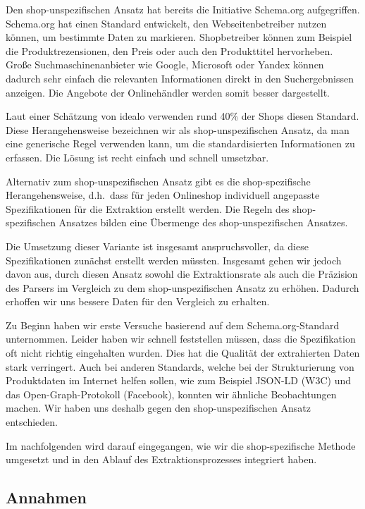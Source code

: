 Den shop-unspezifischen Ansatz hat bereits die Initiative Schema.org aufgegriffen.
Schema.org hat einen Standard entwickelt, den Webseitenbetreiber nutzen können, um bestimmte
Daten zu markieren.
Shopbetreiber können zum Beispiel die Produktrezensionen, den Preis oder auch den Produkttitel hervorheben.
Große Suchmaschinenanbieter wie Google, Microsoft oder Yandex können dadurch sehr einfach die relevanten Informationen
direkt in den Suchergebnissen anzeigen.
Die Angebote der Onlinehändler werden somit besser dargestellt.

Laut einer Schätzung von idealo verwenden rund 40\% der Shops diesen Standard.
Diese Herangehensweise bezeichnen wir als shop-unspezifischen Ansatz, da man eine generische Regel verwenden kann,
um die standardisierten Informationen zu erfassen.
Die Lösung ist recht einfach und schnell umsetzbar.

Alternativ zum shop-unspezifischen Ansatz gibt es die shop-spezifische Herangehensweise, d.h.\ dass für jeden
Onlineshop individuell angepasste Spezifikationen für die Extraktion erstellt werden.
Die Regeln des shop-spezifischen Ansatzes bilden eine Übermenge des shop-unspezifischen Ansatzes.

Die Umsetzung dieser Variante ist insgesamt anspruchsvoller, da diese Spezifikationen zunächst erstellt werden müssten.
Insgesamt gehen wir jedoch davon aus, durch diesen Ansatz sowohl die Extraktionsrate als auch die Präzision des Parsers
im Vergleich zu dem shop-unspezifischen Ansatz zu erhöhen.
Dadurch erhoffen wir uns bessere Daten für den Vergleich zu erhalten.

Zu Beginn haben wir erste Versuche basierend auf dem Schema.org-Standard unternommen.
Leider haben wir schnell feststellen müssen, dass die Spezifikation oft nicht richtig eingehalten wurden.
Dies hat die Qualität der extrahierten Daten stark verringert.
Auch bei anderen Standards, welche bei der Strukturierung von Produktdaten im Internet helfen sollen, wie zum Beispiel
JSON-LD (W3C) und das Open-Graph-Protokoll (Facebook), konnten wir ähnliche Beobachtungen machen.
Wir haben uns deshalb gegen den shop-unspezifischen Ansatz entschieden.

Im nachfolgenden wird darauf eingegangen, wie wir die shop-spezifische Methode umgesetzt und in den Ablauf des
Extraktionsprozesses integriert haben.

\subsection{Annahmen}
\label{subsec:annahmen}


